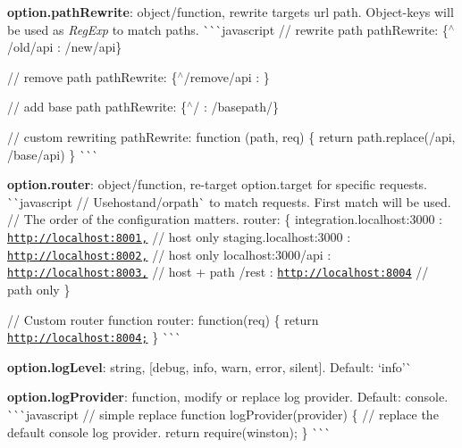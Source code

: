 \begin{DoxyItemize}
\item {\bfseries option.\+path\+Rewrite}\+: object/function, rewrite target\textquotesingle{}s url path. Object-\/keys will be used as {\itshape Reg\+Exp} to match paths. \`{}\`{}\`{}javascript // rewrite path path\+Rewrite\+: \{\textquotesingle{}$^\wedge$/old/api\textquotesingle{} \+: \textquotesingle{}/new/api\textquotesingle{}\}

// remove path path\+Rewrite\+: \{\textquotesingle{}$^\wedge$/remove/api\textquotesingle{} \+: \textquotesingle{}\textquotesingle{}\}

// add base path path\+Rewrite\+: \{\textquotesingle{}$^\wedge$/\textquotesingle{} \+: \textquotesingle{}/basepath/\textquotesingle{}\}

// custom rewriting path\+Rewrite\+: function (path, req) \{ return path.\+replace(\textquotesingle{}/api\textquotesingle{}, \textquotesingle{}/base/api\textquotesingle{}) \} \`{}\`{}\`{}
\item {\bfseries option.\+router}\+: object/function, re-\/target {\ttfamily option.\+target} for specific requests. \`{}\`{}{\ttfamily javascript // Use}host{\ttfamily and/or}path\`{} to match requests. First match will be used. // The order of the configuration matters. router\+: \{ \textquotesingle{}integration.\+localhost\+:3000\textquotesingle{} \+: \textquotesingle{}\href{http://localhost:8001',}{\tt http\+://localhost\+:8001\textquotesingle{},} // host only \textquotesingle{}staging.\+localhost\+:3000\textquotesingle{} \+: \textquotesingle{}\href{http://localhost:8002',}{\tt http\+://localhost\+:8002\textquotesingle{},} // host only \textquotesingle{}localhost\+:3000/api\textquotesingle{} \+: \textquotesingle{}\href{http://localhost:8003',}{\tt http\+://localhost\+:8003\textquotesingle{},} // host + path \textquotesingle{}/rest\textquotesingle{} \+: \textquotesingle{}\href{http://localhost:8004'}{\tt http\+://localhost\+:8004\textquotesingle{}} // path only \}

// Custom router function router\+: function(req) \{ return \textquotesingle{}\href{http://localhost:8004';}{\tt http\+://localhost\+:8004\textquotesingle{};} \} \`{}\`{}\`{}
\item {\bfseries option.\+log\+Level}\+: string, \mbox{[}\textquotesingle{}debug\textquotesingle{}, \textquotesingle{}info\textquotesingle{}, \textquotesingle{}warn\textquotesingle{}, \textquotesingle{}error\textquotesingle{}, \textquotesingle{}silent\textquotesingle{}\mbox{]}. Default\+: `\textquotesingle{}info'\`{}
\item {\bfseries option.\+log\+Provider}\+: function, modify or replace log provider. Default\+: {\ttfamily console}. \`{}\`{}\`{}javascript // simple replace function log\+Provider(provider) \{ // replace the default console log provider. return require(\textquotesingle{}winston\textquotesingle{}); \} \`{}\`{}\`{}


\end{DoxyItemize}
